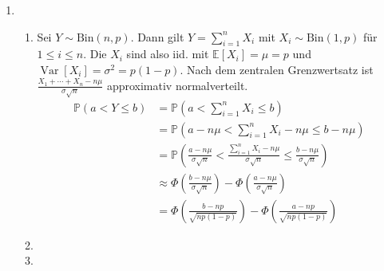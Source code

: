 \documentclass[a4paper]{scrartcl}
\newcommand{\prob}{\mathbb{P}}
\newcommand{\e}{\mathbb{E}}
\newcommand{\var}{\operatorname{Var}}
\def \blattnr {5}
\begin{document}
\begin{enumerate}[label=\bfseries \blattnr.\arabic*]
    \item
        \begin{enumerate}
            \item
                Sei $Y \sim \text{Bin}(n, p)$. Dann gilt $Y = \sum_{i=1}^n X_i$
                mit $X_i \sim \text{Bin}(1, p)$ für $1 \leq i \leq n$. Die
                $X_i$ sind also iid. mit $\e[X_i] = \mu = p$ und $\var[X_i] =
                \sigma^2 = p(1-p)$.
                Nach dem zentralen Grenzwertsatz ist $\frac{X_1 + \dotsb + X_n
                -n\mu}{\sigma\sqrt{n}}$ approximativ normalverteilt.
                \begin{equation*}
                    \begin{split}
                        \prob(a < Y \leq b)
                        &= \prob \left( a < \sum_{i=1}^n X_i \leq b \right) \\
                        &= \prob \left( a-n\mu < \sum_{i=1}^n X_i -n\mu \leq
                            b-n\mu \right) \\
                        &= \prob \left( \frac{a-n\mu}{\sigma\sqrt{n}} <
                            \frac{\sum_{i=1}^n X_i -n\mu}{\sigma\sqrt{n}} \leq
                            \frac{b-n\mu}{\sigma\sqrt{n}} \right) \\
                        &\approx \Phi \left( \frac{b-n\mu}{\sigma\sqrt{n}}
                            \right) - \Phi \left( \frac{a-n\mu}{\sigma\sqrt{n}}
                            \right) \\
                        &= \Phi \left( \frac{b-np}{\sqrt{np(1-p)}} \right) -
                            \Phi \left( \frac{a-np}{\sqrt{np(1-p)}} \right)
                    \end{split}
                \end{equation*}

	      
            \item

            \item

        \end{enumerate}
   
\end{enumerate}
\end{document}
